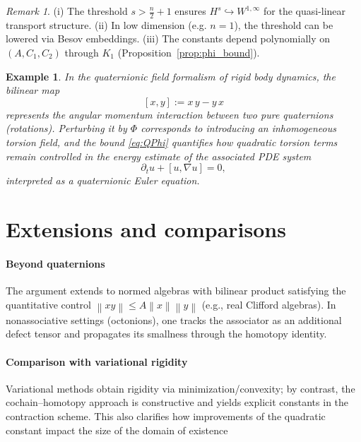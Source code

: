 \documentclass[10pt]{amsart}
\newcommand{\norm}[1]{\left\lVert #1 \right\rVert}
\numberwithin{equation}{section}
\newtheorem{example}[theorem]{Example}
\theoremstyle{remark}
\newtheorem{rmk}[theorem]{Remark}
\theoremstyle{definition}
\begin{document}
\begin{rmk}
(i) The threshold $s>\tfrac n2+1$ ensures $H^s\hookrightarrow W^{1,\infty}$ for the quasi-linear transport structure.
(ii) In low dimension (e.g. $n=1$), the threshold can be lowered via Besov embeddings.
(iii) The constants depend polynomially on $(A,C_1,C_2)$ through $K_1$ (Proposition~\ref{prop:phi_bound}).
\end{rmk}

\begin{example}
In the quaternionic field formalism of rigid body dynamics, the bilinear map
\[
[x,y] := x\,y - y\,x
\]
represents the angular momentum interaction between two pure quaternions (rotations).
Perturbing it by $\Phi$ corresponds to introducing an inhomogeneous torsion field,
and the bound \eqref{eq:QPhi} quantifies how quadratic torsion terms remain controlled
in the energy estimate of the associated PDE system
\[
\partial_t u + [u,\nabla u] = 0,
\]
interpreted as a quaternionic Euler equation.
\end{example}
\section{Extensions and comparisons}\label{ExCa}

\paragraph{Beyond quaternions}
The argument extends to normed algebras with bilinear product satisfying the
quantitative control $\norm{xy}\le A\norm{x}\norm{y}$ (e.g., real Clifford algebras).
In nonassociative settings (octonions), one tracks the associator as an additional
defect tensor and propagates its smallness through the homotopy identity.

\paragraph{Comparison with variational rigidity}
Variational methods obtain rigidity via minimization/convexity; by contrast, the
cochain--homotopy approach is constructive and yields explicit constants in the
contraction scheme. This also clarifies how improvements of the quadratic constant
impact the size of the domain of existence
\end{document}
